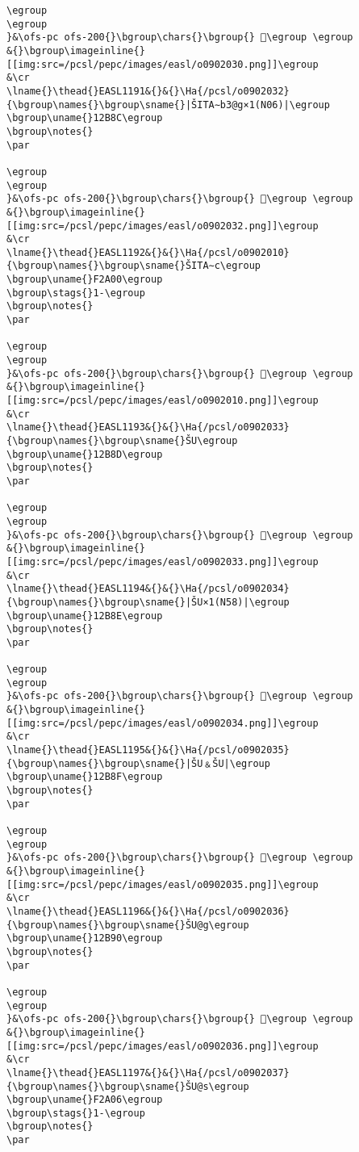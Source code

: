 \begin{verbatim}
\egroup
\egroup
}&\ofs-pc ofs-200{}\bgroup\chars{}\bgroup{} 𒮋\egroup \egroup
&{}\bgroup\imageinline{}[[img:src=/pcsl/pepc/images/easl/o0902030.png]]\egroup
&\cr
\lname{}\thead{}EASL1191&{}&{}\Ha{/pcsl/o0902032}{\bgroup\names{}\bgroup\sname{}|ŠITA∼b3@g×1(N06)|\egroup
\bgroup\uname{}12B8C\egroup
\bgroup\notes{}
\par 

\egroup
\egroup
}&\ofs-pc ofs-200{}\bgroup\chars{}\bgroup{} 𒮌\egroup \egroup
&{}\bgroup\imageinline{}[[img:src=/pcsl/pepc/images/easl/o0902032.png]]\egroup
&\cr
\lname{}\thead{}EASL1192&{}&{}\Ha{/pcsl/o0902010}{\bgroup\names{}\bgroup\sname{}ŠITA∼c\egroup
\bgroup\uname{}F2A00\egroup
\bgroup\stags{}1-\egroup
\bgroup\notes{}
\par 

\egroup
\egroup
}&\ofs-pc ofs-200{}\bgroup\chars{}\bgroup{} 󲨀\egroup \egroup
&{}\bgroup\imageinline{}[[img:src=/pcsl/pepc/images/easl/o0902010.png]]\egroup
&\cr
\lname{}\thead{}EASL1193&{}&{}\Ha{/pcsl/o0902033}{\bgroup\names{}\bgroup\sname{}ŠU\egroup
\bgroup\uname{}12B8D\egroup
\bgroup\notes{}
\par 

\egroup
\egroup
}&\ofs-pc ofs-200{}\bgroup\chars{}\bgroup{} 𒮍\egroup \egroup
&{}\bgroup\imageinline{}[[img:src=/pcsl/pepc/images/easl/o0902033.png]]\egroup
&\cr
\lname{}\thead{}EASL1194&{}&{}\Ha{/pcsl/o0902034}{\bgroup\names{}\bgroup\sname{}|ŠU×1(N58)|\egroup
\bgroup\uname{}12B8E\egroup
\bgroup\notes{}
\par 

\egroup
\egroup
}&\ofs-pc ofs-200{}\bgroup\chars{}\bgroup{} 𒮎\egroup \egroup
&{}\bgroup\imageinline{}[[img:src=/pcsl/pepc/images/easl/o0902034.png]]\egroup
&\cr
\lname{}\thead{}EASL1195&{}&{}\Ha{/pcsl/o0902035}{\bgroup\names{}\bgroup\sname{}|ŠU﹠ŠU|\egroup
\bgroup\uname{}12B8F\egroup
\bgroup\notes{}
\par 

\egroup
\egroup
}&\ofs-pc ofs-200{}\bgroup\chars{}\bgroup{} 𒮏\egroup \egroup
&{}\bgroup\imageinline{}[[img:src=/pcsl/pepc/images/easl/o0902035.png]]\egroup
&\cr
\lname{}\thead{}EASL1196&{}&{}\Ha{/pcsl/o0902036}{\bgroup\names{}\bgroup\sname{}ŠU@g\egroup
\bgroup\uname{}12B90\egroup
\bgroup\notes{}
\par 

\egroup
\egroup
}&\ofs-pc ofs-200{}\bgroup\chars{}\bgroup{} 𒮐\egroup \egroup
&{}\bgroup\imageinline{}[[img:src=/pcsl/pepc/images/easl/o0902036.png]]\egroup
&\cr
\lname{}\thead{}EASL1197&{}&{}\Ha{/pcsl/o0902037}{\bgroup\names{}\bgroup\sname{}ŠU@s\egroup
\bgroup\uname{}F2A06\egroup
\bgroup\stags{}1-\egroup
\bgroup\notes{}
\par 


\end{verbatim}
